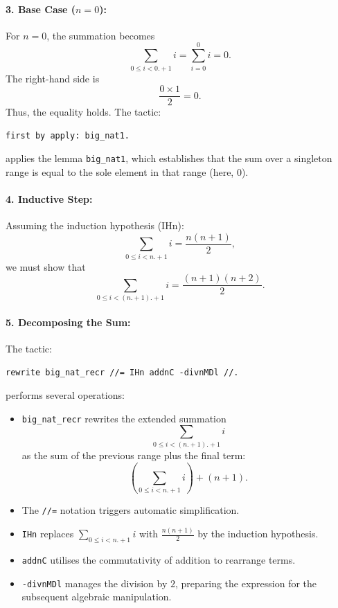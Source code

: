 \documentclass[letterpaper]{article}
\begin{document}
\paragraph{3. Base Case (\( n = 0 \)):}
For \( n = 0 \), the summation becomes
\[
\sum_{0 \le i < 0.+1} i = \sum_{i=0}^{0} i = 0.
\]
The right-hand side is
\[
\frac{0 \times 1}{2} = 0.
\]
Thus, the equality holds. The tactic:
\begin{verbatim}
first by apply: big_nat1.
\end{verbatim}
applies the lemma \texttt{big\_nat1}, which establishes that the sum over a singleton range is equal to the sole element in that range (here, \(0\)).

\paragraph{4. Inductive Step:}
Assuming the induction hypothesis (IHn):
\[
\sum_{0 \le i < n.+1} i = \frac{n(n+1)}{2},
\]
we must show that
\[
\sum_{0 \le i < (n.+1).+1} i = \frac{(n+1)(n+2)}{2}.
\]

\paragraph{5. Decomposing the Sum:}
The tactic:
\begin{verbatim}
rewrite big_nat_recr //= IHn addnC -divnMDl //.
\end{verbatim}
performs several operations:
\begin{itemize}
    \item \texttt{big\_nat\_recr} rewrites the extended summation 
    \[
    \sum_{0 \le i < (n.+1).+1} i
    \]
    as the sum of the previous range plus the final term:
    \[
    \left(\sum_{0 \le i < n.+1} i\right) + (n+1).
    \]
    \item The \texttt{//=} notation triggers automatic simplification.
    \item \texttt{IHn} replaces \(\sum_{0 \le i < n.+1} i\) with \(\frac{n(n+1)}{2}\) by the induction hypothesis.
    \item \texttt{addnC} utilises the commutativity of addition to rearrange terms.
    \item \texttt{-divnMDl} manages the division by \( 2 \), preparing the expression for the subsequent algebraic manipulation.
\end{itemize}
\end{document}
